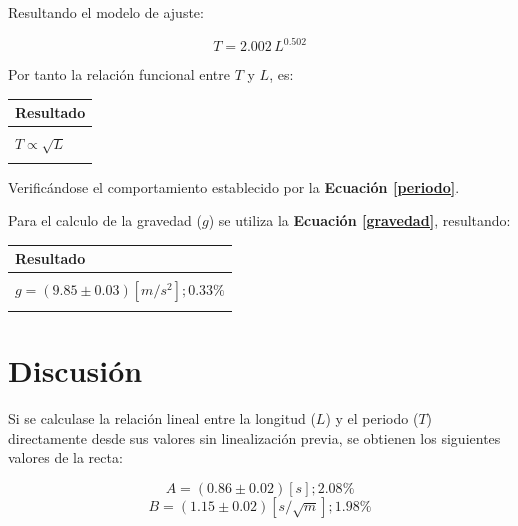 \documentclass[letter,11pt]{article}
\begin{document}
Resultando el modelo de ajuste:

\begin{equation*}
    T = 2.002\,L^{0.502}
\end{equation*}
\vspace{0.10cm}

Por tanto la relación funcional entre $T$ y $L$, es:

\begin{center}
\begin{tabular}{|>{\centering}m{9.2cm}<{\centering}|}
\hline
\textbf{Resultado} 
\tabularnewline \hline
\\
$T \propto \sqrt{L}$ \tabularnewline
\\
\hline
\end{tabular}
\end{center}
\vspace{0.10cm}

Verificándose el comportamiento establecido por la
\textbf{Ecuación \ref{periodo}}.

Para el calculo de la gravedad ($g$) se utiliza la
\textbf{Ecuación \ref{gravedad}}, resultando:

\begin{center}
\begin{tabular}{|>{\centering}m{9.2cm}<{\centering}|}
\hline
\textbf{Resultado} 
\tabularnewline \hline
\\
$g = (9.85 \pm 0.03) [m/s^2]; 0.33\%$ \tabularnewline
\\
\hline
\end{tabular}
\end{center}
\vspace{0.10cm}

\section{Discusión}

Si se calculase la relación lineal entre la longitud ($L$) y el periodo ($T$)
directamente desde sus valores sin linealización previa, se obtienen los
siguientes valores de la recta:

\begin{equation*}
    A = (0.86 \pm 0.02) [s]; 2.08\%
\end{equation*}
\begin{equation*}
    B = (1.15 \pm 0.02) [s/\sqrt{m}]; 1.98\%
\end{equation*}
\vspace{0.10cm}
\end{document}
